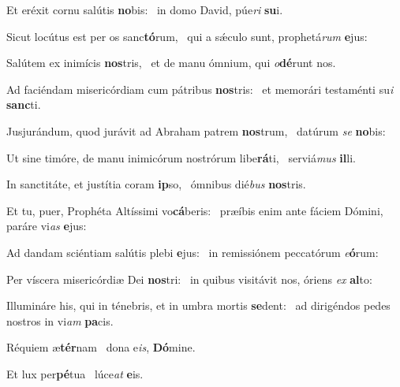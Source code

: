 \item Et eréxit cornu salútis \textbf{no}bis:~\psstar{} in domo David, púe\textit{ri} \textbf{su}i.

\item Sicut locútus est per os sanc\textbf{tó}rum,~\psstar{} qui a sǽculo sunt, prophetá\textit{rum} \textbf{e}jus:

\item Salútem ex inimícis \textbf{nos}tris,~\psstar{} et de manu ómnium, qui \textit{o}\textbf{dé}runt nos.

\item Ad faciéndam misericórdiam cum pátribus \textbf{nos}tris:~\psstar{} et memorári testaménti su\textit{i} \textbf{sanc}ti.

\item Jusjurándum, quod jurávit ad Abraham patrem \textbf{nos}trum,~\psstar{} datúrum \textit{se} \textbf{no}bis:

\item Ut sine timóre, de manu inimicórum nostrórum libe\textbf{rá}ti,~\psstar{} serviá\textit{mus} \textbf{il}li.

\item In sanctitáte, et justítia coram \textbf{ip}so,~\psstar{} ómnibus dié\textit{bus} \textbf{nos}tris.

\item Et tu, puer, Prophéta Altíssimi vo\textbf{cá}beris:~\psstar{} præíbis enim ante fáciem Dómini, paráre vi\textit{as} \textbf{e}jus:

\item Ad dandam sciéntiam salútis plebi \textbf{e}jus:~\psstar{} in remissiónem peccatórum \textit{e}\textbf{ó}rum:

\item Per víscera misericórdiæ Dei \textbf{nos}tri:~\psstar{} in quibus visitávit nos, óriens \textit{ex} \textbf{al}to:

\item Illumináre his, qui in ténebris, et in umbra mortis \textbf{se}dent:~\psstar{} ad dirigéndos pedes nostros in vi\textit{am} \textbf{pa}cis.

\item Réquiem æ\textbf{tér}nam~\psstar{} dona e\textit{is}, \textbf{Dó}mine.

\item Et lux per\textbf{pé}tua~\psstar{} lúce\textit{at} \textbf{e}is.